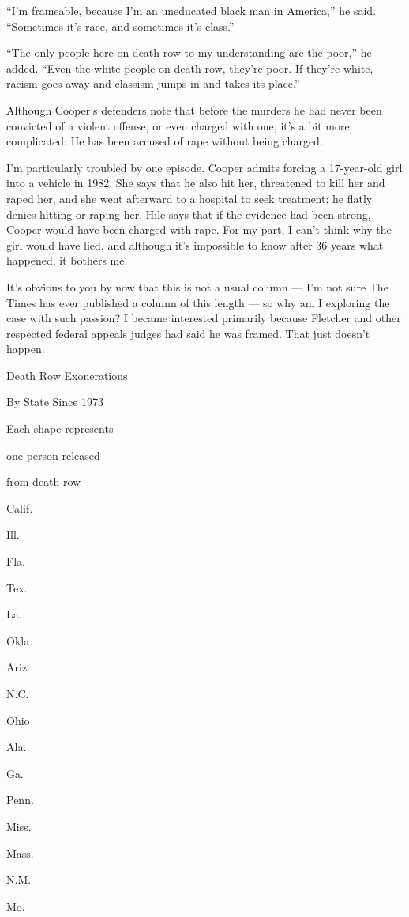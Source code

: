 ``I'm frameable, because I'm an uneducated black man in America,'' he
said. ``Sometimes it's race, and sometimes it's class.''

``The only people here on death row to my understanding are the poor,''
he added. ``Even the white people on death row, they're poor. If they're
white, racism goes away and classism jumps in and takes its place.''

Although Cooper's defenders note that before the murders he had never
been convicted of a violent offense, or even charged with one, it's a
bit more complicated: He has been accused of rape without being charged.

I'm particularly troubled by one episode. Cooper admits forcing a
17-year-old girl into a vehicle in 1982. She says that he also hit her,
threatened to kill her and raped her, and she went afterward to a
hospital to seek treatment; he flatly denies hitting or raping her. Hile
says that if the evidence had been strong, Cooper would have been
charged with rape. For my part, I can't think why the girl would have
lied, and although it's impossible to know after 36 years what happened,
it bothers me.

It's obvious to you by now that this is not a usual column --- I'm not
sure The Times has ever published a column of this length --- so why am
I exploring the case with such passion? I became interested primarily
because Fletcher and other respected federal appeals judges had said he
was framed. That just doesn't happen.

Death Row Exonerations

By State Since 1973

Each shape represents

one person released

from death row

Calif.

Ill.

Fla.

Tex.

La.

Okla.

Ariz.

N.C.

Ohio

Ala.

Ga.

Penn.

Miss.

Mass.

N.M.

Mo.

